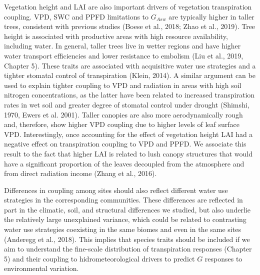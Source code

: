 \documentclass[11pt,twoside]{reedthesis}
\begin{document}
Vegetation height and LAI are also important drivers of vegetation
transpiration coupling. VPD, SWC and PPFD limitations to \(G_{Asw}\) are
typically higher in taller trees, consistent with previous studies
(Boese et al., 2018; Zhao et al., 2019). Tree height is associated with
productive areas with high resource availability, including water. In
general, taller trees live in wetter regions and have higher water
transport efficiencies and lower resistance to embolism (Liu et al.,
2019, Chapter 5). These traits are associated with acquisitive water use
strategies and a tighter stomatal control of transpiration (Klein,
2014). A similar argument can be used to explain tighter coupling to VPD
and radiation in areas with high soil nitrogen concentrations, as the
latter have been related to increased transpiration rates in wet soil
and greater degree of stomatal control under drought (Shimshi, 1970,
Ewers et al. 2001). Taller canopies are also more aerodynamically rough
and, therefore, show higher VPD coupling due to higher levels of leaf
surface VPD. Interestingly, once accounting for the effect of vegetation
height LAI had a negative effect on transpiration coupling to VPD and
PPFD. We associate this result to the fact that higher LAI is related to
lush canopy structures that would have a significant proportion of the
leaves decoupled from the atmosphere and from direct radiation income
(Zhang et al., 2016).\par

Differences in coupling among sites should also reflect different water
use strategies in the corresponding communities. These differences are
reflected in part in the climatic, soil, and structural differences we
studied, but also underlie the relatively large unexplained variance,
which could be related to contrasting water use strategies coexisting in
the same biomes and even in the same sites (Anderegg et al., 2018). This
implies that species traits should be included if we aim to understand
the fine-scale distribution of transpiration responses (Chapter 5) and
their coupling to hidrometeorological drivers to predict \(G\) responses
to environmental variation.\par
\end{document}
